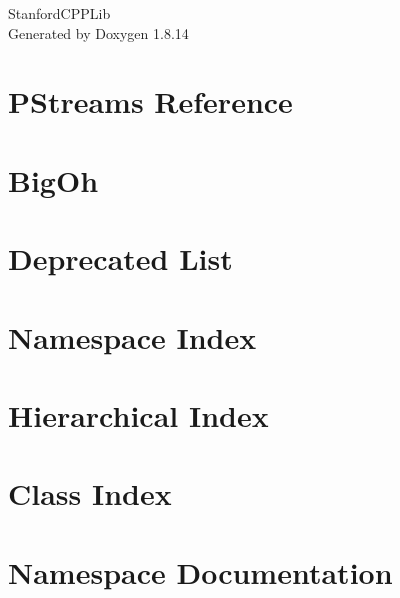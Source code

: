 \documentclass[twoside]{book}
\newcommand{\+}{\discretionary{\mbox{\scriptsize$\hookleftarrow$}}{}{}}
\newcommand{\clearemptydoublepage}{%
  \newpage{\pagestyle{empty}\cleardoublepage}%
}
\begin{document}
\hypersetup{pageanchor=false,
             bookmarksnumbered=true,
             pdfencoding=unicode
            }
\begin{titlepage}
\vspace*{7cm}
\begin{center}%
{\Large Stanford\+C\+P\+P\+Lib }\\
\vspace*{1cm}
{\large Generated by Doxygen 1.8.14}\\
\end{center}
\end{titlepage}
\clearemptydoublepage
{}
\tableofcontents
\clearemptydoublepage
{}
\hypersetup{pageanchor=true}

\chapter{P\+Streams Reference}
\label{index}\hypertarget{index}{}
\chapter{Big\+Oh}
\label{BigOh}

\chapter{Deprecated List}
\label{deprecated}

\chapter{Namespace Index}

\chapter{Hierarchical Index}

\chapter{Class Index}

\chapter{Namespace Documentation}



















\end{document}
